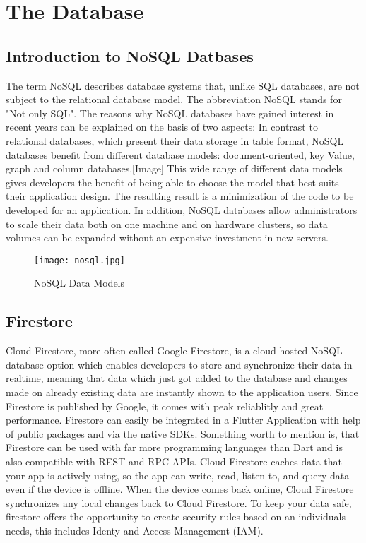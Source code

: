 
\chapter{The Database}

\section{Introduction to NoSQL Datbases}
The term NoSQL describes database systems that, unlike SQL databases, are not subject to the relational database model. The abbreviation NoSQL stands for "Not only SQL". The reasons why NoSQL databases have gained interest in recent years can be explained on the basis of two aspects: In contrast to relational databases, which present their data storage in table format, NoSQL databases benefit from different database models: document-oriented, key Value, graph and column databases.[Image] This wide range of different data models gives developers the benefit of being able to choose the model that best suits their application design. The resulting result is a minimization of the code to be developed for an application. In addition, NoSQL databases allow administrators to scale their data both on one machine and on hardware clusters, so data volumes can be expanded without an expensive investment in new servers.
 \begin{figure}
	\centering
	\texttt{[image: nosql.jpg]}
	\caption[NoSQL Data Models]{NoSQL Data Models}
\end{figure}
\section{Firestore}
Cloud Firestore, more often called Google Firestore, is a cloud-hosted NoSQL database option which enables developers to store and synchronize their data in realtime, meaning that data which just got added to the database and changes made on already existing data are instantly shown to the application users. Since Firestore is published by Google, it comes with peak reliablitly and great performance.  Firestore can easily be integrated in a Flutter Application with help of public packages and via the native SDKs. Something worth to mention is, that Firestore can be used with far more programming languages than Dart and is also compatible with REST and RPC APIs. Cloud Firestore caches data that your app is actively using, so the app can write, read, listen to, and query data even if the device is offline. When the device comes back online, Cloud Firestore synchronizes any local changes back to Cloud Firestore. To keep your data safe, firestore offers the opportunity to create security rules based on an individuals needs, this includes Identy and Access Management (IAM).

